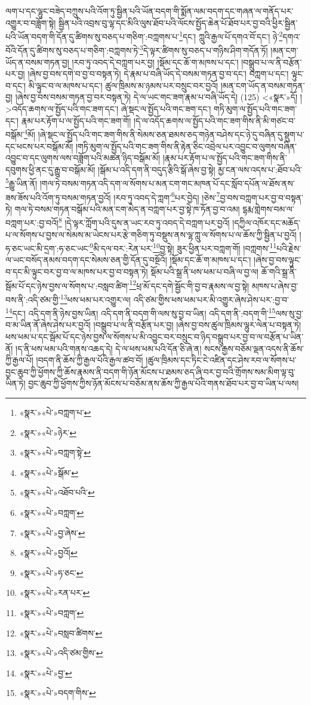 ལག་པ་དང་ལྷུང་བཟེད་བཀྲུས་པའི་འོག་ཏུ་སྦྱིན་པའི་ཡོན་བདག་གི་སྨོན་ལམ་བདག་དང་གཞན་ལ་གནོད་པར་འགྱུར་བ་བཟློག་སྟེ། སྦྱིན་པའི་འབྲས་བུ་ལྷ་དང་མིའི་ལུས་ཐོབ་པའི་ལོངས་སྤྱོད་ཆེན་པོ་ཐོབ་པར་བྱ་བའི་ཕྱིར་སྦྱིན་པའི་ཡོན་བདག་གི་དོན་དུ་ཚིགས་སུ་བཅད་པ་གཅིག་:བཀླགས་པ་\footnote{«སྣར་»«པེ་»བཀླག་པ་}དང་། ཀླུའི་རྒྱལ་པོ་དགའ་བོ་དང་། ཉེ་\footnote{«སྣར་»«པེ་»ཉེར་}དགའ་བོའི་དོན་དུ་ཚིགས་སུ་བཅད་པ་གཅིག་:བཀླགས་ཏེ་\footnote{«སྣར་»«པེ་»བཀླག་སྟེ་}དེ་ལྟར་ཚིགས་སུ་བཅད་པ་གཉིས་ཤིག་གདོན་ཏོ། །མན་ངག་ཡོད་ན་བསམ་གཏན་བྱ། །རབ་ཏུ་འབད་དེ་བཀླག་པར་བྱ། །སྡོམ་དང་ཆོ་ག་མཁས་པ་དང་། །བསྒྲུབ་པ་ལ་ནི་བརྩོན་པར་བྱ། །ཞེས་བྱ་བས་དགེ་བ་བྱ་བ་བསྟན་ཏེ། དེ་རྣམ་པ་བཞི་ཡོད་དེ་བསམ་གཏན་བྱ་བ་དང་། བཀླག་པ་དང་། ལྟུང་བ་དང་། མི་ལྟུང་བ་ལ་མཁས་པ་དང་། ཚུལ་ཁྲིམས་མ་ཉམས་པར་བསྲུང་བར་བྱའོ། །མན་ངག་ཡོད་ན་བསམ་གཏན་བྱ། །ཞེས་བྱ་བས་བསམ་གཏན་བྱ་བར་བསྟན་ཏེ། དེ་ལ་ཡང་གང་ཟག་རྣམ་པ་བཞི་ཡོད་དེ། (125) <«སྣར་»དོ། །
 >འདོད་ཆགས་ལ་སྤྱོད་པའི་གང་ཟག་དང་། ཞེ་སྡང་ལ་སྤྱོད་པའི་གང་ཟག་དང་། གཏི་མུག་ལ་སྤྱོད་པའི་གང་ཟག་དང་། རྣམ་པར་རྟོག་པ་ལ་སྤྱོད་པའི་གང་ཟག་གོ། །དེ་ལ་འདོད་ཆགས་ལ་སྤྱོད་པའི་གང་ཟག་གིས་ནི་མི་གཙང་བ་བསྒོམ་\footnote{«སྣར་»«པེ་»སྒོམ་}མོ། །ཞེ་སྡང་ལ་སྤྱོད་པའི་གང་ཟག་གིས་ནི་སེམས་ཅན་ཐམས་ཅད་གཉེན་བཤེས་དང་ཉེ་དུ་བཞིན་དུ་སྡུག་པ་དང་ཕངས་པར་བསྒོམ་མོ། །གཏི་མུག་ལ་སྤྱོད་པའི་གང་ཟག་གིས་ནི་རྟེན་ཅིང་འབྲེལ་པར་འབྱུང་བ་ལུགས་བཞིན་འབྱུང་བ་དང་ལུགས་ལས་བཟློག་པའི་མཚན་ཉིད་བསྒོམ་མོ། །རྣམ་པར་རྟོག་པ་ལ་སྤྱོད་པའི་གང་ཟག་གིས་ནི་དབུགས་ཕྱི་ནང་དུ་རྒྱུ་བ་བསྒོམ་མོ། །སྒོམ་པ་འདི་དག་ནི་བདུད་རྩིའི་སྒོ་ཞེས་བྱ་སྟེ། མྱ་ངན་ལས་འདས་པ་:ཐོབ་པའི་\footnote{«སྣར་»«པེ་»འཐོབ་པའི་}རྒྱུ་ཡིན་ནོ། །གལ་ཏེ་བསམ་གཏན་འདི་དག་ལ་སོགས་པ་མན་ངག་གང་མཁན་པོ་དང་སློབ་དཔོན་ལ་ཐོས་ནས་ཟས་ཟོས་པའི་འོག་ཏུ་བསམ་གཏན་བྱའོ། །རབ་ཏུ་འབད་དེ་ཀླག་\footnote{«སྣར་»«པེ་»བཀླག་}པར་བྱེད། །ཅེས་\footnote{«སྣར་»«པེ་»བྱ་ཞེས་}བྱ་བས་བཀླག་པར་བྱ་བ་བསྟན་ཏེ། གལ་ཏེ་བསམ་གཏན་བསྒོམ་པའི་མན་ངག་མེད་ན་བཀླག་པར་བྱ་སྟེ་ཁ་ཏོན་བྱ་བ་འམ། དྷརྨ་གླེགས་བམ་ལ་བཀླག་པར་:བྱ་བའོ།\footnote{«སྣར་»«པེ་»བྱའོ།} །དེ་ལྟར་ཀློག་པའི་དུས་ན་ཡང་རབ་ཏུ་འབད་དེ་བཀླག་པར་བྱའོ། །དཀྱིལ་འཁོར་དང་མཆོད་པ་ལ་སོགས་པ་བྱས་ལ་སེམས་མ་ཡེངས་པར་རྩེ་གཅིག་ཏུ་བསྡུས་ནས་ལྷ་ཀླུ་ལ་སོགས་པ་ལ་ཆོས་ཀྱི་སྦྱིན་པ་བྱའོ། །ཧ་ཅང་ཡང་མི་དྲག་:ཧ་ཅང་ཡང་\footnote{«སྣར་»«པེ་»ཧ་ཅང་}མི་དལ་བར་:རེན་པར་\footnote{«སྣར་»«པེ་»རན་པར་}བྱ་སྟེ། ཟུར་ཕྱིན་པར་བཀླག་གོ། །བཀླགས་\footnote{«སྣར་»«པེ་»བཀླག་}པའི་རྗེས་ལ་ཡང་བསོད་ནམས་བདག་དང་སེམས་ཅན་གྱི་དོན་དུ་བསྔོའོ། །སྡོམ་དང་ཆོ་ག་མཁས་པ་དང་། །ཞེས་བྱ་བས་ལྟུང་བ་དང་མི་ལྟུང་བར་བྱ་བ་ལ་མཁས་པར་བྱ་བ་བསྟན་ཏེ། སྡོམ་པའི་སྒྲ་ནི་ཕས་ཕམ་པ་བཞི་ལ་བྱ་ལ། ཆོ་གའི་སྒྲ་ནི་སྦོམ་པོ་དང་ཉེས་བྱས་ལ་སོགས་པ་:བསླབ་ཚིག་\footnote{«སྣར་»«པེ་»བསླབ་ཚིགས་}ཕྲ་མོ་དང་དགེ་སྦྱོང་གི་བྱ་བ་རྣམས་ལ་བྱ་སྟེ། མཁས་པ་ཞེས་བྱ་བས་ནི་:འདི་ཙམ་གྱི་\footnote{«སྣར་»«པེ་»འདི་ཙམ་གྱིས་}ཕས་ཕམ་པར་འགྱུར་ལ། འདི་ཙམ་གྱིས་ཕས་ཕམ་པར་མི་འགྱུར་ཞེས་ཤེས་པར་:བྱ་བ་\footnote{«སྣར་»«པེ་»བྱ་}དང་། འདི་དག་ནི་ཉེས་བྱས་ཡིན། འདི་དག་ནི་བདག་གི་ལས་སུ་བྱ་བ་ཡིན། འདི་དག་ནི་:བདག་གི་\footnote{«སྣར་»«པེ་»བདག་གིས་}ལས་སུ་བྱ་བ་མ་ཡིན་ནོ་ཞེས་ཤེས་པར་བྱའོ། །བསྒྲུབ་པ་ལ་ནི་བརྩོན་པར་བྱ། །ཞེས་བྱ་བས་ཚུལ་ཁྲིམས་ལྷུར་ལེན་པ་བསྟན་ཏེ། ཕས་ཕམ་པ་དང་སྦོམ་པོ་དང་ཉེས་བྱས་ལ་སོགས་པ་མི་འབྱུང་བར་བསྲུང་བ་ཉིད་བསྒྲུབ་པར་བྱ་བ་ལ་བརྩོན་པ་ཡིན་ནོ། །ད་ནི་ཕས་ཕམ་པའི་གནས་འཆད་དེ། དེ་ལ་ཕས་ཕམ་པའི་དོན་ཅི་ཞེ་ན། སངས་རྒྱས་བཅོམ་ལྡན་འདས་ནི་ཆོས་ཀྱི་རྒྱལ་པོ། །བདག་ནི་ཆོས་ཀྱི་རྒྱལ་པོའི་རྒྱལ་ཚབ་བོ། །ཚུལ་ཁྲིམས་དང་ཏིང་ངེ་འཛིན་དང་ཤེས་རབ་ལ་སོགས་པ་བྱང་ཆུབ་ཀྱི་ཕྱོགས་ཀྱི་ཆོས་རྣམས་ནི་བདག་གི་ཉོན་མོངས་པ་ཐམས་ཅད་ཞི་བར་བྱ་བའི་གྲོགས་སམ་མིག་ལྟ་བུ་ཡིན་ཏེ། བྱང་ཆུབ་ཀྱི་ཕྱོགས་ཀྱིས་ཉོན་མོངས་པ་བཅོམ་ནས་ཆོས་ཀྱི་རྒྱལ་པོའི་གནས་ཐོབ་པར་བྱ་བ་ཡིན་པ་ལས། 